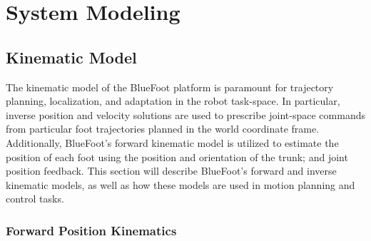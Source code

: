 \chapter{System Modeling}
	\label{ch::system_modeling}

	
	\section{Kinematic Model}
		\label{sec::system_kinematics}

		The kinematic model of the BlueFoot platform is paramount for trajectory planning, localization, and adaptation in the robot task-space. In particular, inverse position and velocity solutions are used to prescribe joint-space commands from particular foot trajectories planned in the world coordinate frame. Additionally, BlueFoot's forward kinematic model is utilized to estimate the position of each foot using the position and orientation of the trunk; and joint position feedback. This section will describe BlueFoot's forward and inverse kinematic models, as well as how these models are used in motion planning and control tasks.

		\subsection{Forward Position Kinematics}
			\label{ch::system_modeling_pos_kin}

